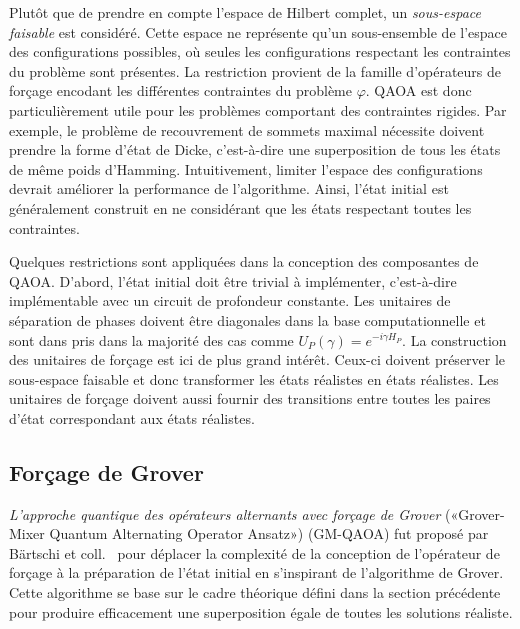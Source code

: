 Plutôt que de prendre en compte l'espace de Hilbert complet, un \textit{sous-espace faisable} est considéré. Cette espace ne représente qu'un sous-ensemble de l'espace des configurations possibles, où seules les configurations respectant les contraintes du problème sont présentes. La restriction provient de la famille d'opérateurs de forçage encodant les différentes contraintes du problème $\varphi$. QAOA est donc particulièrement utile pour les problèmes comportant des contraintes rigides. Par exemple, le problème de recouvrement de sommets maximal nécessite doivent prendre la forme d'état de Dicke, c'est-à-dire une superposition de tous les états de même poids d'Hamming. Intuitivement, limiter l'espace des configurations devrait améliorer la performance de l'algorithme. Ainsi, l'état initial est généralement construit en ne considérant que les états respectant toutes les contraintes.

Quelques restrictions sont appliquées dans la conception des composantes de QAOA. D'abord, l'état initial doit être trivial à implémenter, c'est-à-dire implémentable avec un circuit de profondeur constante. Les unitaires de séparation de phases doivent être diagonales dans la base computationnelle et sont dans pris dans la majorité des cas comme $U_{P}(\gamma) = e^{-i \gamma H_{P}}$. La construction des unitaires de forçage est ici de plus grand intérêt. Ceux-ci doivent préserver le sous-espace faisable et donc transformer les états réalistes en états réalistes. Les unitaires de forçage doivent aussi fournir des transitions entre toutes les paires d'état correspondant aux états réalistes.



\subsection{Forçage de Grover}

\textit{L'approche quantique des opérateurs alternants avec forçage de Grover} («Grover-Mixer Quantum Alternating Operator Ansatz») (GM-QAOA) fut proposé par Bärtschi et coll.~\cite{bartschiGroverMixersQAOA2020} pour déplacer la complexité de la conception de l'opérateur de forçage à la préparation de l'état initial en s'inspirant de l'algorithme de Grover. Cette algorithme se base sur le cadre théorique défini dans la section précédente pour produire efficacement une superposition égale de toutes les solutions réaliste.

